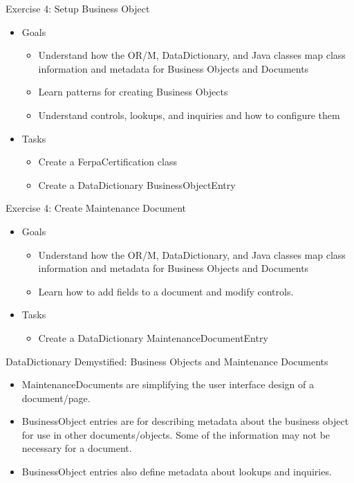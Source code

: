 \documentclass[xcolor=dvipsnames,14pt]{beamer}
\begin{document}
\begin{frame}{Exercise 4: Setup Business Object}
	\begin{itemize}
		\item Goals
          \begin{itemize}
            \item Understand how the OR/M, DataDictionary, and Java
              classes map class information and metadata for Business
              Objects and Documents
            \item Learn patterns for creating Business Objects
            \item Understand controls, lookups, and inquiries and how
              to configure them
          \end{itemize}          
		\item Tasks	
          \begin{itemize}
            \item Create a FerpaCertification class
            \item Create a DataDictionary BusinessObjectEntry
          \end{itemize}          
\end{itemize}
\end{frame}

\begin{frame}{Exercise 4: Create Maintenance Document}
	\begin{itemize}
		\item Goals
          \begin{itemize}
            \item Understand how the OR/M, DataDictionary, and Java
              classes map class information and metadata for Business
              Objects and Documents
            \item Learn how to add fields to a document and modify controls.
          \end{itemize}          
		\item Tasks	
          \begin{itemize}
            \item Create a DataDictionary MaintenanceDocumentEntry
          \end{itemize}          
        \end{itemize}
\end{frame}

\begin{frame}{DataDictionary Demystified: Business Objects and
    Maintenance Documents}
  \begin{itemize}
    \item MaintenanceDocuments are simplifying the user interface
      design of a document/page.
    \item BusinessObject entries are for describing metadata about the
      business object for use in other documents/objects. Some of the
      information may not be necessary for a document.
    \item BusinessObject entries also define metadata about lookups
      and inquiries.
  \end{itemize}           
\end{frame}
\end{document}
